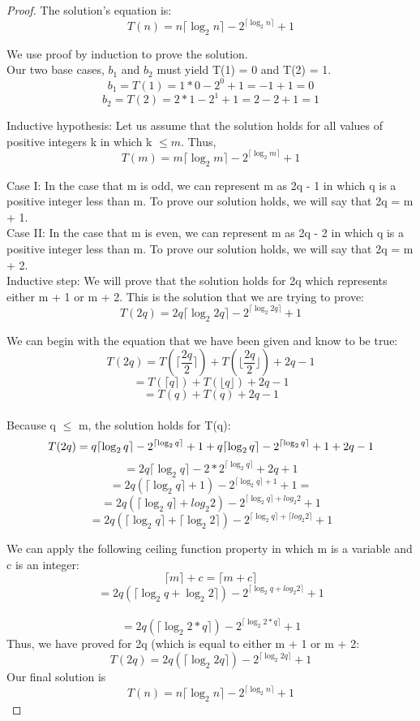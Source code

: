 \documentclass[11pt, solution, letterpaper]{format}
\begin{document}
\begin{enumerate}
\begin{proof} The solution's equation is: 
$$T(n) = n\lceil\log_2 n \rceil - 2^{\lceil \log_2 n \rceil} + 1$$


We use proof by induction to prove the solution. \\
Our two base cases, $b_1$ and $b_2$ must yield T(1) = 0 and T(2) = 1.
$$b_1 = T(1) = 1*0 - 2^0 + 1 = -1 + 1 = 0 $$ 
$$b_2 = T(2) = 2*1 - 2^1 + 1 = 2 - 2 + 1 = 1$$ 

Inductive hypothesis: Let us assume that the solution holds for all values of positive integers k in which k $\leq m$. Thus, 
$$T(m) = m\lceil\log_2 m \rceil - 2^{\lceil \log_2 m \rceil} + 1$$ 

Case I: In the case that m is odd, we can represent m as 2q - 1 in which q is a positive integer less than m. To prove our solution holds, we will say that 2q = m + 1. \\

Case II: In the case that m is even, we can represent m as 2q - 2 in which q is a positive integer less than m. To prove our solution holds, we will say that 2q = m + 2. \\

Inductive step: We will prove that the solution holds for 2q which represents either m + 1 or m + 2.
This is the solution that we are trying to prove: 
$$T(2q) = 2q\lceil\log_2 2q \rceil - 2^{\lceil \log_2 2q \rceil} + 1$$ 

We can begin with the equation that we have been given and know to be true:
$$T(2q) = T(\lceil \frac{2q}{2} \rceil) + T(\lfloor \frac{2q}{2} \rfloor) + 2q - 1$$$$=T(\lceil q \rceil) + T(\lfloor q \rfloor) + 2q - 1$$$$ =T(q) + T(q) + 2q - 1 $$ \\
  Because q $\leq$ m, the solution holds for T(q):
$$T(2q) = q\lceil\log_2 q \rceil - 2^{\lceil \log_2 q \rceil} + 1 + q\lceil\log_2 q \rceil - 2^{\lceil \log_2 q \rceil} + 1 + 2q - 1\\ $$
$$=2q\lceil\log_2 q \rceil  - 2*2^{\lceil \log_2 q \rceil} + 2q + 1$$ 
$$=2q(\lceil\log_2 q \rceil + 1) -2^{\lceil \log_2 q \rceil + 1} + 1 =$$
$$=2q(\lceil\log_2 q \rceil + log_2 2) -2^{\lceil \log_2 q \rceil + log_2 2} + 1$$
$$= 2q(\lceil\log_2 q \rceil + \lceil\log_2 2\rceil) -2^{\lceil \log_2 q \rceil + \lceil log_2 2\rceil} + 1$$

We can apply the following ceiling function property in which m is a variable and c is an integer: $$\lceil m \rceil + c = \lceil m + c \rceil$$
$$= 2q(\lceil\log_2 q  + \log_2 2\rceil) -2^{\lceil \log_2 q + log_2 2\rceil} + 1 $$ \\
$$= 2q(\lceil\log_2 2*q \rceil) -2^{\lceil \log_2 2*q \rceil} + 1 $$
Thus, we have proved for 2q (which is equal to either m + 1 or m + 2:
$$T(2q)= 2q(\lceil\log_2 2q \rceil) -2^{\lceil \log_2 2q \rceil} + 1 $$
Our final solution is $$T(n) = n\lceil\log_2 n \rceil - 2^{\lceil \log_2 n \rceil} + 1$$
\end{proof}


\end{enumerate}
\clearpage
\end{document}
